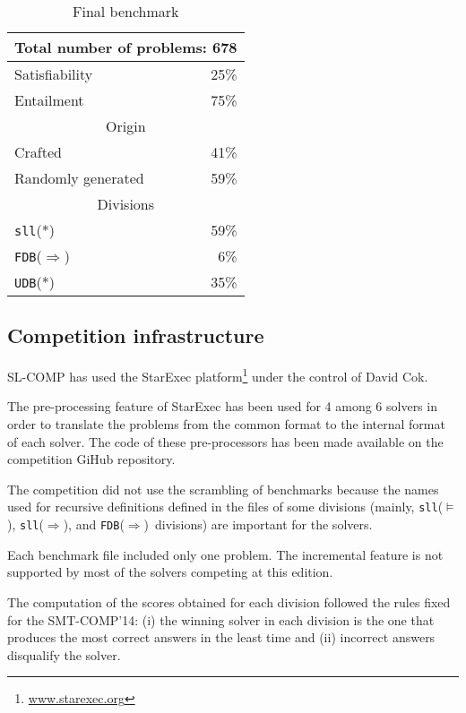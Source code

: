 \documentclass{llncs}
\newcommand{\limp}{\Rightarrow}
\newcommand{\sllsat}{\texttt{sll}($\models$)}
\newcommand{\sllent}{\texttt{sll}($\limp$)}
\newcommand{\FDBent}{\texttt{FDB}($\limp$)}
\begin{document}
\begin{table}
\begin{center}
\begin{tabular}{p{7cm}r}\hline
\multicolumn{2}{c}{Total number of problems: 678} \\
\hline
Satisfiability & 25\% \\
Entailment & 75\% \\
\hline
%
\hline
\multicolumn{2}{c}{Origin} \\
\hline
Crafted & 41\% \\
Randomly generated & 59\% \\
\hline
%
\hline
\multicolumn{2}{c}{Divisions} \\
\hline
\texttt{sll}(*) & 59\% \\
\FDBent & 6\% \\
\texttt{UDB}(*) & 35\% \\
\hline
\end{tabular}
\end{center}
\caption{Final benchmark}
\label{tab:bench}
\end{table}




\subsection{Competition infrastructure}

SL-COMP has used the StarExec platform\footnote{\url{www.starexec.org}} under the control of David Cok. 

The pre-processing feature of StarExec has been used for 4 among 6 solvers in order to translate the problems from the common format to the internal format of each solver. The code of these pre-processors has been made available on the competition GiHub repository.

The competition did not use the scrambling of benchmarks because the names used for recursive definitions defined in the files of some divisions (mainly, \sllsat, \sllent, and \FDBent\ divisions) are important for the solvers.

Each benchmark file included only one problem. 
The incremental feature is not supported by most of the solvers competing at this edition.

The computation of the scores obtained for each division followed the rules fixed for the SMT-COMP'14: 
(i) the winning solver in each division is the one that produces the most correct answers in the least time and
(ii) incorrect answers disqualify the solver.
\end{document}
